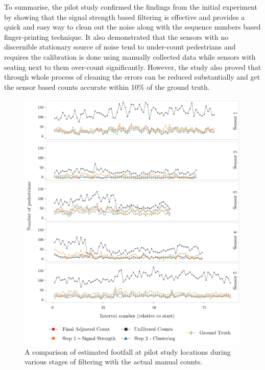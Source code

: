 To summarise, the pilot study confirmed the findings from the initial experiment by showing that the signal strength based filtering is effective and provides a quick and easy way to clean out the noise along with the sequence numbers based finger-printing technique.
It also demonstrated that the sensors with no discernible stationary source of noise tend to under-count pedestrians and requires the calibration is done using manually collected data while sensors with seating next to them over-count significantly.
However, the study also proved that through whole process of cleaning the errors can be reduced substantially and get the sensor based counts accurate within 10\% of the ground truth.

\begin{figure}
  \includegraphics[trim=6 6 6 6, clip]{images/processing-pilot-results.jpg}
  \caption{A comparison of estimated footfall at pilot study locations during various stages of filtering with the actual manual counts.}
  \label{figure:processing:pilot:final}
\end{figure}

